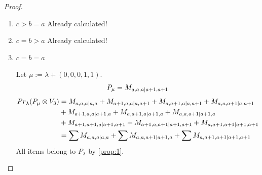 \begin{proof}
\begin{enumerate}
  \item $c>b=a$ Already calculated!

  \item $c=b>a$ Already calculated!

  \item $c=b=a$ \par
        Let $\mu:=\lambda + (0,0,0,1,1) $.
        \begin{equation}\notag
          \begin{aligned}
            P_\mu = M_{a,a,a|a+1,a+1}
          \end{aligned}
        \end{equation}
        \begin{equation}\notag
          \begin{aligned}
            Pr_{\lambda}(P_\mu \otimes V_{3}) &=
M_{a,a,a|a,a}
+ M_{a+1,a,a|a,a+1}
+ M_{a,a+1,a|a,a+1}
+ M_{a,a,a+1|a,a+1}\\
                                            &
+ M_{a+1,a,a|a+1,a}
+ M_{a,a+1,a|a+1,a}
+ M_{a,a,a+1|a+1,a}\\
                                            &
+ M_{a+1,a+1,a|a+1,a+1}
+ M_{a+1,a,a+1|a+1,a+1}
+ M_{a,a+1,a+1|a+1,a+1} \\
                                               &=
\sum M_{a,a,a|a,a}
+ \sum M_{a,a,a+1|a+1,a}
+ \sum M_{a,a+1,a+1|a+1,a+1}
          \end{aligned}
        \end{equation}
All items belong to $P_\lambda$ by \cref{prop:1}.
\end{enumerate}
\end{proof}

